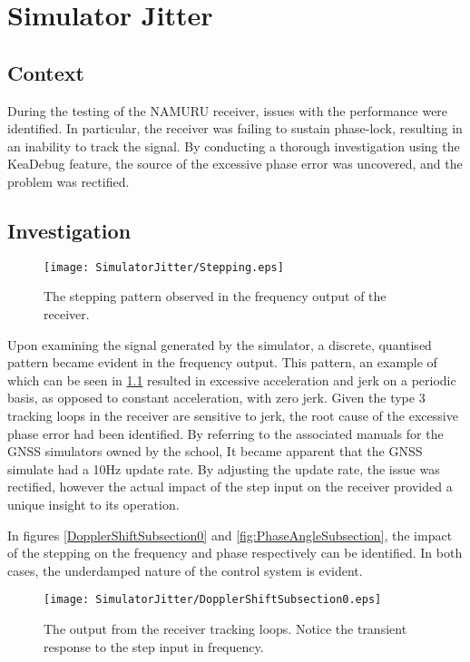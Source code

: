 \label{ch:SimJitter}
\chapter{Simulator Jitter}

\section{Context}
During the testing of the NAMURU receiver, issues with the performance were identified. In particular, the receiver was failing to sustain phase-lock, resulting in an inability to track the signal. By conducting a thorough investigation using the KeaDebug feature, the source of the excessive phase error was uncovered, and the problem was rectified. 

\section{Investigation}

\begin{figure}[!htb] 
    \centering
    \texttt{[image: SimulatorJitter/Stepping.eps]} 
    \caption{The stepping pattern observed in the frequency output of the receiver.}
    \label{fig:Stepping}
\end{figure}

Upon examining the signal generated by the simulator, a discrete, quantised pattern became evident in the frequency output. This pattern, an example of which can be seen in \ref{fig:Stepping} resulted in excessive acceleration and jerk on a periodic basis, as opposed to constant acceleration, with zero jerk. Given the type 3 tracking loops in the receiver are sensitive to jerk, the root cause of the excessive phase error had been identified. By referring to the associated manuals for the GNSS simulators owned by the school, It became apparent that the GNSS simulate had a 10Hz update rate. By adjusting the update rate, the issue was rectified, however the actual impact of the step input on the receiver provided a unique insight to its operation.

In figures \ref{DopplerShiftSubsection0} and \ref{fig:PhaseAngleSubsection}, the impact of the stepping on the frequency and phase respectively can be identified. In both cases, the underdamped nature of the control system is evident. 

\begin{figure}[!htb] 
    \centering
    \texttt{[image: SimulatorJitter/DopplerShiftSubsection0.eps]} 
    \caption{The output from the receiver tracking loops. Notice the transient response to the step input in frequency.}
    \label{fig:DopplerShiftSubsection0}
\end{figure}

